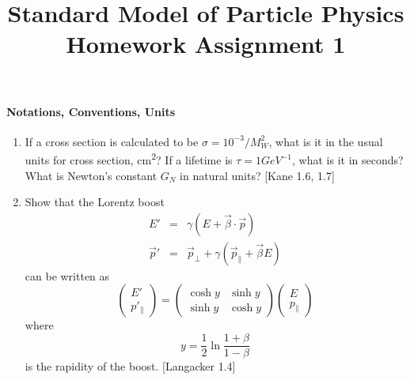 \documentclass[letterpaper,11pt]{article}
\title{Standard Model of Particle Physics \\ Homework Assignment 1}
\begin{document}
\maketitle

\paragraph*{Notations, Conventions, Units}
\begin{enumerate}
 \item If a cross section is calculated to be $\sigma = 10^{-3}/M_W^2$, what is it in the usual units for cross section, \si{cm^2}? If a lifetime is $\tau = \si{1}{GeV^{-1}}$, what is it in seconds? What is Newton's constant $G_N$ in natural units? [Kane 1.6, 1.7]
 \item Show that the Lorentz boost
 \begin{eqnarray*}
  E' & = & \gamma \left( E + \vec{\beta} \cdot \vec{p} \right) \\
  \vec{p}' & = & \vec{p}_\perp + \gamma \left( \vec{p}_\parallel + \vec{\beta} E \right)
 \end{eqnarray*}
 can be written as
 \begin{equation*}
  \left( \begin{array}{c} E' \\ p'_\parallel \end{array} \right) =
  \left( \begin{array}{cc} \cosh y & \sinh y \\ \sinh y & \cosh y \end{array} \right)
  \left( \begin{array}{c} E \\ p_\parallel \end{array} \right)
 \end{equation*}
 where
 \begin{equation*}
  y = \frac{1}{2} \ln \frac{1+\beta}{1-\beta}
 \end{equation*}
 is the rapidity of the boost. [Langacker 1.4]
\end{enumerate}
\end{document}
